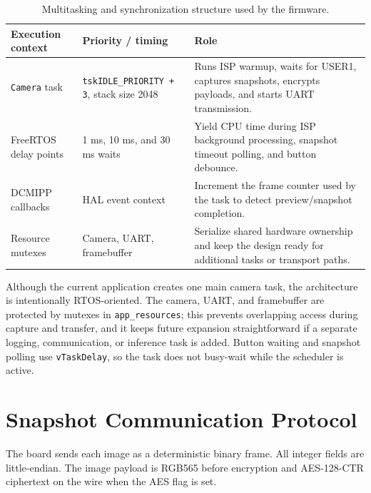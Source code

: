 \documentclass[11pt,a4paper]{article}
\begin{document}
\begin{table}[H]
\centering
\begin{tabularx}{0.96\textwidth}{@{}l l X@{}}
\toprule
\textbf{Execution context} & \textbf{Priority / timing} & \textbf{Role} \\
\midrule
\texttt{Camera} task & \texttt{tskIDLE\_PRIORITY + 3}, stack size 2048 & Runs ISP warmup, waits for USER1, captures snapshots, encrypts payloads, and starts UART transmission. \\
FreeRTOS delay points & 1 ms, 10 ms, and 30 ms waits & Yield CPU time during ISP background processing, snapshot timeout polling, and button debounce. \\
DCMIPP callbacks & HAL event context & Increment the frame counter used by the task to detect preview/snapshot completion. \\
Resource mutexes & Camera, UART, framebuffer & Serialize shared hardware ownership and keep the design ready for additional tasks or transport paths. \\
\bottomrule
\end{tabularx}
\caption{Multitasking and synchronization structure used by the firmware.}
\label{tab:multitasking}
\end{table}

Although the current application creates one main camera task, the architecture
is intentionally RTOS-oriented. The camera, UART, and framebuffer are protected
by mutexes in \texttt{app\_resources}; this prevents overlapping access during
capture and transfer, and it keeps future expansion straightforward if a
separate logging, communication, or inference task is added. Button waiting and
snapshot polling use \texttt{vTaskDelay}, so the task does not busy-wait while
the scheduler is active.

\section{Snapshot Communication Protocol}
The board sends each image as a deterministic binary frame. All integer fields
are little-endian. The image payload is RGB565 before encryption and AES-128-CTR
ciphertext on the wire when the AES flag is set.
\end{document}

